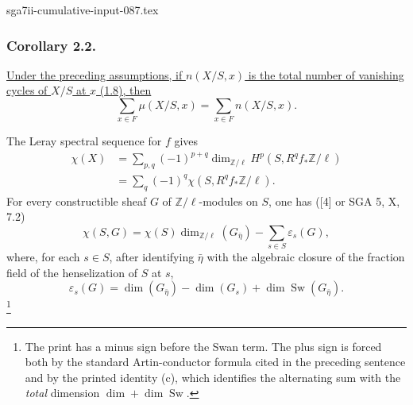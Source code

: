 \begin{filecontents*}{sga7ii-cumulative-input-087.tex}
\subsubsection*{Corollary 2.2.}
\underline{Under the preceding assumptions, if $n(X/S,x)$ is the
total number of vanishing cycles of $X/S$ at $x$ (1.8), then}
\[
\sum_{x\in F}\mu(X/S,x)=\sum_{x\in F}n(X/S,x).
\]

The Leray spectral sequence for $f$ gives
\begin{align*}
\chi(X)
&=\sum_{p,q}(-1)^{p+q}
\dim_{\mathbb Z/\ell}H^p(S,R^qf_*\mathbb Z/\ell)\\
&=\sum_q(-1)^q\chi(S,R^qf_*\mathbb Z/\ell).
\end{align*}
For every constructible sheaf $G$ of $\mathbb Z/\ell$-modules on
$S$, one has ([4] or SGA 5, X, 7.2)
\[
\chi(S,G)=\chi(S)\dim_{\mathbb Z/\ell}(G_{\bar\eta})
-\sum_{s\in S}\varepsilon_s(G),
\]
where, for each $s\in S$, after identifying $\bar\eta$ with the
algebraic closure of the fraction field of the henselization of $S$
at $s$,
\[
\varepsilon_s(G)=
\dim(G_{\bar\eta})-\dim(G_s)+\dim\operatorname{Sw}(G_{\bar\eta}).
\]
\footnote{The print has a minus sign before the Swan term.  The plus
sign is forced both by the standard Artin-conductor formula cited in
the preceding sentence and by the printed identity (c), which
identifies the alternating sum with the \emph{total} dimension
$\dim+\dim\operatorname{Sw}$.}


\end{filecontents*}
